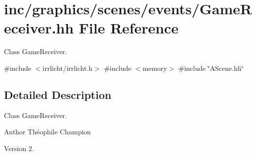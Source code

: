 \hypertarget{GameReceiver_8hh}{}\section{inc/graphics/scenes/events/\+Game\+Receiver.hh File Reference}
\label{GameReceiver_8hh}


Class Game\+Receiver.  


{\ttfamily \#include $<$irrlicht/irrlicht.\+h$>$}\newline
{\ttfamily \#include $<$memory$>$}\newline
{\ttfamily \#include \char`\"{}A\+Scene.\+hh\char`\"{}}\newline


\subsection{Detailed Description}
Class Game\+Receiver. 

\begin{DoxyAuthor}{Author}
Théophile Champion 
\end{DoxyAuthor}
\begin{DoxyVersion}{Version}
2. 
\end{DoxyVersion}
